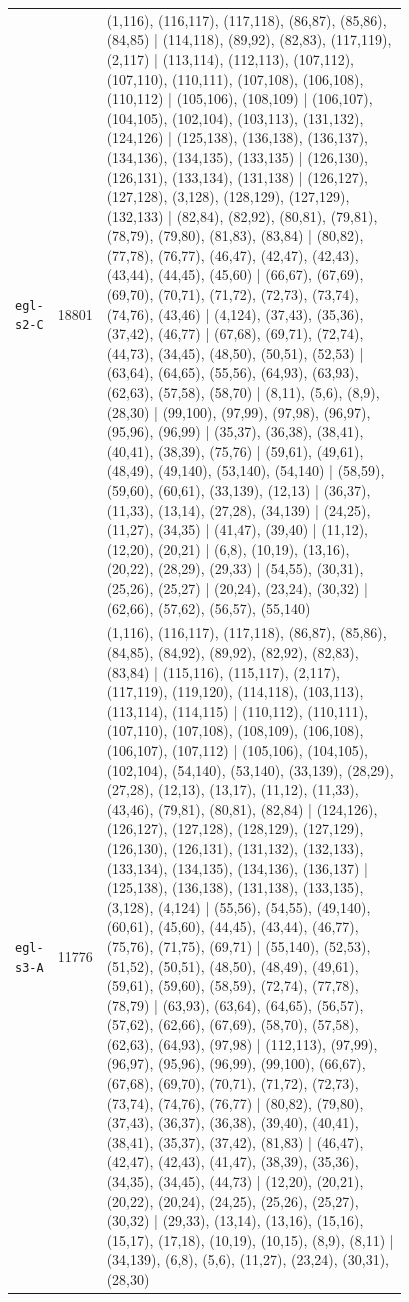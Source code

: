 \begin{landscape}
\begin{longtable}{lr>{\tiny\raggedright\arraybackslash}p{0.78\linewidth}}
\texttt{egl-s2-C} & 18801 & (1,116), (116,117), (117,118), (86,87), (85,86), (84,85) | (114,118), (89,92), (82,83), (117,119), (2,117) | (113,114), (112,113), (107,112), (107,110), (110,111), (107,108), (106,108), (110,112) | (105,106), (108,109) | (106,107), (104,105), (102,104), (103,113), (131,132), (124,126) | (125,138), (136,138), (136,137), (134,136), (134,135), (133,135) | (126,130), (126,131), (133,134), (131,138) | (126,127), (127,128), (3,128), (128,129), (127,129), (132,133) | (82,84), (82,92), (80,81), (79,81), (78,79), (79,80), (81,83), (83,84) | (80,82), (77,78), (76,77), (46,47), (42,47), (42,43), (43,44), (44,45), (45,60) | (66,67), (67,69), (69,70), (70,71), (71,72), (72,73), (73,74), (74,76), (43,46) | (4,124), (37,43), (35,36), (37,42), (46,77) | (67,68), (69,71), (72,74), (44,73), (34,45), (48,50), (50,51), (52,53) | (63,64), (64,65), (55,56), (64,93), (63,93), (62,63), (57,58), (58,70) | (8,11), (5,6), (8,9), (28,30) | (99,100), (97,99), (97,98), (96,97), (95,96), (96,99) | (35,37), (36,38), (38,41), (40,41), (38,39), (75,76) | (59,61), (49,61), (48,49), (49,140), (53,140), (54,140) | (58,59), (59,60), (60,61), (33,139), (12,13) | (36,37), (11,33), (13,14), (27,28), (34,139) | (24,25), (11,27), (34,35) | (41,47), (39,40) | (11,12), (12,20), (20,21) | (6,8), (10,19), (13,16), (20,22), (28,29), (29,33) | (54,55), (30,31), (25,26), (25,27) | (20,24), (23,24), (30,32) | (62,66), (57,62), (56,57), (55,140) \\[2pt]
\texttt{egl-s3-A} & 11776 & (1,116), (116,117), (117,118), (86,87), (85,86), (84,85), (84,92), (89,92), (82,92), (82,83), (83,84) | (115,116), (115,117), (2,117), (117,119), (119,120), (114,118), (103,113), (113,114), (114,115) | (110,112), (110,111), (107,110), (107,108), (108,109), (106,108), (106,107), (107,112) | (105,106), (104,105), (102,104), (54,140), (53,140), (33,139), (28,29), (27,28), (12,13), (13,17), (11,12), (11,33), (43,46), (79,81), (80,81), (82,84) | (124,126), (126,127), (127,128), (128,129), (127,129), (126,130), (126,131), (131,132), (132,133), (133,134), (134,135), (134,136), (136,137) | (125,138), (136,138), (131,138), (133,135), (3,128), (4,124) | (55,56), (54,55), (49,140), (60,61), (45,60), (44,45), (43,44), (46,77), (75,76), (71,75), (69,71) | (55,140), (52,53), (51,52), (50,51), (48,50), (48,49), (49,61), (59,61), (59,60), (58,59), (72,74), (77,78), (78,79) | (63,93), (63,64), (64,65), (56,57), (57,62), (62,66), (67,69), (58,70), (57,58), (62,63), (64,93), (97,98) | (112,113), (97,99), (96,97), (95,96), (96,99), (99,100), (66,67), (67,68), (69,70), (70,71), (71,72), (72,73), (73,74), (74,76), (76,77) | (80,82), (79,80), (37,43), (36,37), (36,38), (39,40), (40,41), (38,41), (35,37), (37,42), (81,83) | (46,47), (42,47), (42,43), (41,47), (38,39), (35,36), (34,35), (34,45), (44,73) | (12,20), (20,21), (20,22), (20,24), (24,25), (25,26), (25,27), (30,32) | (29,33), (13,14), (13,16), (15,16), (15,17), (17,18), (10,19), (10,15), (8,9), (8,11) | (34,139), (6,8), (5,6), (11,27), (23,24), (30,31), (28,30) \\[2pt]

\end{longtable}
\end{landscape}
